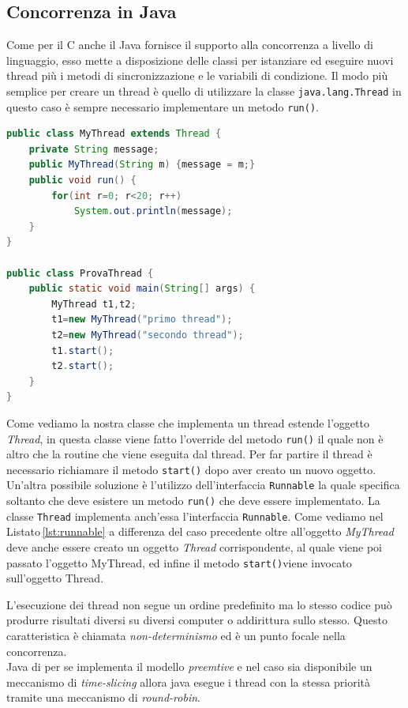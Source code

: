 \subsection{Concorrenza in Java}
Come per il C anche il Java fornisce il supporto alla concorrenza a livello di linguaggio, esso mette a disposizione delle classi per istanziare ed eseguire nuovi thread più i metodi di sincronizzazione e le variabili di condizione.
Il modo più semplice per creare un thread è quello di utilizzare la classe \texttt{java.lang.Thread} in questo caso è sempre necessario implementare un metodo \texttt{run()}.
\begin{lstlisting}[language=Java,caption={Uso della classe Thread in Java},label=lst:jthread]
public class MyThread extends Thread {
	private String message;
	public MyThread(String m) {message = m;}
	public void run() {
		for(int r=0; r<20; r++)
			System.out.println(message);
	}
}

public class ProvaThread {
	public static void main(String[] args) {
		MyThread t1,t2;
		t1=new MyThread("primo thread");
		t2=new MyThread("secondo thread");
		t1.start();
		t2.start();
	}
}
\end{lstlisting}
Come vediamo la nostra classe che implementa un thread estende l'oggetto \emph{Thread}, in questa classe viene fatto l'override del metodo \texttt{run()} il quale non è altro che la routine che viene eseguita dal thread. Per far partire il thread è necessario richiamare il metodo \texttt{start()} dopo aver creato un nuovo oggetto.\\
Un'altra possibile soluzione è l'utilizzo dell'interfaccia \texttt{Runnable} la quale specifica soltanto che deve esistere un metodo \texttt{run()} che deve essere implementato. La classe \texttt{Thread} implementa anch'essa l'interfaccia \texttt{Runnable}.
Come vediamo nel Listato\,\ref{lst:runnable} a differenza del caso precedente oltre all'oggetto \emph{MyThread} deve anche essere creato un oggetto \emph{Thread} corrispondente, al quale viene poi passato l'oggetto MyThread, ed infine il metodo \texttt{start()}viene invocato sull'oggetto Thread.

L'esecuzione dei thread non segue un ordine predefinito ma lo stesso codice può produrre risultati diversi su diversi computer o addirittura sullo stesso. Questo caratteristica è chiamata \emph{non-determinismo} ed è un punto focale nella concorrenza.\\
Java di per se implementa il modello \emph{preemtive} e nel caso sia disponibile un meccanismo di \emph{time-slicing} allora java esegue i thread con la stessa priorità tramite una meccanismo di \emph{round-robin}.\\
